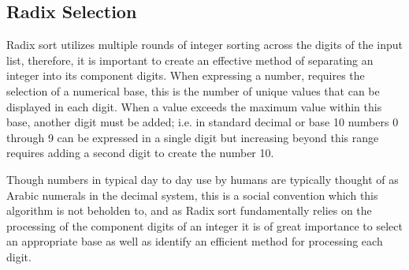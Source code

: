 \documentclass[12pt]{article}
\begin{document}
	\subsection{Radix Selection}
	
	\label{sec:radixselection}
	Radix sort utilizes multiple rounds of integer sorting across the digits of the input list, therefore, it is important to create an effective method of separating an integer into its component digits. When expressing a number, requires the selection of a numerical base, this is the number of unique values that can be displayed in each digit. When a value exceeds the maximum value within this base, another digit must be added; i.e. in standard decimal or base 10 numbers 0 through 9 can be expressed in a single digit but increasing beyond this range requires adding a second digit to create the number 10.
	\par
	Though numbers in typical day to day use by humans are typically thought of as Arabic numerals in the decimal system, this is a social convention which this algorithm is not beholden to, and as Radix sort fundamentally relies on the processing of the component digits of an integer it is of great importance to select an appropriate base as well as identify an efficient method for processing each digit.
\end{document}
